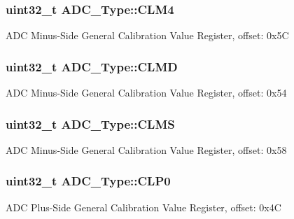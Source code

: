 \subsubsection[{\texorpdfstring{C\+L\+M4}{CLM4}}]{ uint32\+\_\+t A\+D\+C\+\_\+\+Type\+::\+C\+L\+M4}\hypertarget{structADC__Type_ae5a5b0377261f6593f1ad3f51a4681ad}{}\label{structADC__Type_ae5a5b0377261f6593f1ad3f51a4681ad}
A\+DC Minus-\/\+Side General Calibration Value Register, offset\+: 0x5C 
\subsubsection[{\texorpdfstring{C\+L\+MD}{CLMD}}]{ uint32\+\_\+t A\+D\+C\+\_\+\+Type\+::\+C\+L\+MD}\hypertarget{structADC__Type_a7354e8844f8eabbe072fd015e5f321a6}{}\label{structADC__Type_a7354e8844f8eabbe072fd015e5f321a6}
A\+DC Minus-\/\+Side General Calibration Value Register, offset\+: 0x54 
\subsubsection[{\texorpdfstring{C\+L\+MS}{CLMS}}]{ uint32\+\_\+t A\+D\+C\+\_\+\+Type\+::\+C\+L\+MS}\hypertarget{structADC__Type_aaf8e34a694e7cefc2f3f750ec6947658}{}\label{structADC__Type_aaf8e34a694e7cefc2f3f750ec6947658}
A\+DC Minus-\/\+Side General Calibration Value Register, offset\+: 0x58 
\subsubsection[{\texorpdfstring{C\+L\+P0}{CLP0}}]{ uint32\+\_\+t A\+D\+C\+\_\+\+Type\+::\+C\+L\+P0}\hypertarget{structADC__Type_a18689175e64a715367784c7c84c0200d}{}\label{structADC__Type_a18689175e64a715367784c7c84c0200d}
A\+DC Plus-\/\+Side General Calibration Value Register, offset\+: 0x4C 
